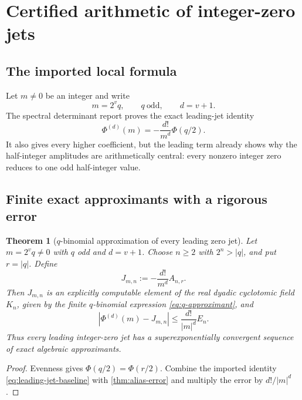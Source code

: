 \documentclass[11pt,oneside]{article}
\newtheorem{theorem}{Theorem}[section]
\theoremstyle{definition}
\theoremstyle{remark}
\newcommand{\PhiU}{\Phi}
\begin{document}
\section{Certified arithmetic of integer-zero jets}\label{sec:zero-jets}

\subsection{The imported local formula}

Let $m\ne0$ be an integer and write
\begin{equation}\label{eq:m-v-q}
 m=2^vq,
 \qquad q\ \text{odd},
 \qquad d=v+1.
\end{equation}
The spectral determinant report proves the exact leading-jet identity
\begin{equation}\label{eq:leading-jet-baseline}
 \PhiU^{(d)}(m)=-\frac{d!}{m^d}\PhiU(q/2).
\end{equation}
It also gives every higher coefficient, but the leading term already shows why
the half-integer amplitudes are arithmetically central: every nonzero integer
zero reduces to one odd half-integer value.

\subsection{Finite exact approximants with a rigorous error}

\begin{theorem}[$q$-binomial approximation of every leading zero jet]\label{thm:jet-approximant}
Let $m=2^vq\ne0$ with $q$ odd and $d=v+1$.  Choose $n\ge2$ with
$2^n>|q|$, and put $r=|q|$.  Define
\begin{equation}\label{eq:J-m-n}
 J_{m,n}:=-\frac{d!}{m^d}A_{n,r}.
\end{equation}
Then $J_{m,n}$ is an explicitly computable element of the real dyadic
cyclotomic field $K_n$, given by the finite $q$-binomial expression
\eqref{eq:q-approximant}, and
\begin{equation}\label{eq:jet-error}
 \boxed{
 |\PhiU^{(d)}(m)-J_{m,n}|
 \le\frac{d!}{|m|^d}E_n.}
\end{equation}
Thus every leading integer-zero jet has a superexponentially convergent sequence
of exact algebraic approximants.
\end{theorem}

\begin{proof}
Evenness gives $\PhiU(q/2)=\PhiU(r/2)$.  Combine the imported identity
\eqref{eq:leading-jet-baseline} with \cref{thm:alias-error} and multiply the
error by $d!/|m|^d$.
\end{proof}
\end{document}
